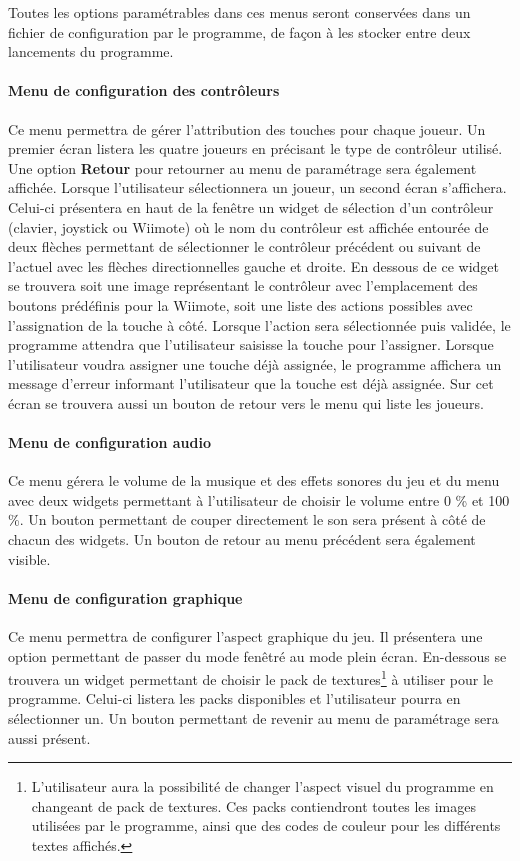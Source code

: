 Toutes les options paramétrables dans ces menus seront conservées dans un fichier de configuration par le programme, de façon à les stocker entre deux lancements du programme.

\paragraph{Menu de configuration des contrôleurs}

Ce menu permettra de gérer l'attribution des touches pour chaque joueur. Un premier écran listera les quatre joueurs en précisant le type de contrôleur utilisé. Une option \textbf{Retour} pour retourner au menu de paramétrage sera également affichée. Lorsque l'utilisateur sélectionnera un joueur, un second écran s'affichera. Celui-ci présentera en haut de la fenêtre un widget de sélection d'un contrôleur (clavier, joystick ou Wiimote) où le nom du contrôleur est affichée entourée de deux flèches permettant de sélectionner le contrôleur précédent ou suivant de l'actuel avec les flèches directionnelles gauche et droite. En dessous de ce widget se trouvera soit une image représentant le contrôleur avec l'emplacement des boutons prédéfinis pour la Wiimote, soit une liste des actions possibles avec l'assignation de la touche à côté. Lorsque l'action sera sélectionnée puis validée, le programme attendra que l'utilisateur saisisse la touche pour l'assigner. Lorsque l'utilisateur voudra assigner une touche déjà assignée, le programme affichera un message d'erreur informant l'utilisateur que la touche est déjà assignée. Sur cet écran se trouvera aussi un bouton de retour vers le menu qui liste les joueurs.

\paragraph{Menu de configuration audio}

Ce menu gérera le volume de la musique et des effets sonores du jeu et du menu avec deux widgets permettant à l'utilisateur de choisir le volume entre 0 \% et 100 \%. Un bouton permettant de couper directement le son sera présent à côté de chacun des widgets. Un bouton de retour au menu précédent sera également visible.

\paragraph{Menu de configuration graphique}

Ce menu permettra de configurer l'aspect graphique du jeu. Il présentera une option permettant de passer du mode fenêtré au mode plein écran. En-dessous se trouvera un widget permettant de choisir le pack de textures\footnote{L'utilisateur aura la possibilité de changer l'aspect visuel du programme en changeant de pack de textures. Ces packs contiendront toutes les images utilisées par le programme, ainsi que des codes de couleur pour les différents textes affichés.} à utiliser pour le programme. Celui-ci listera les packs disponibles et l'utilisateur pourra en sélectionner un. Un bouton permettant de revenir au menu de paramétrage sera aussi présent.\\



